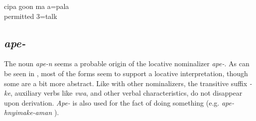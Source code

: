 \ea\label{ex:goon_hunpala}
\gll cipa goon ma a=pala\\
  permitted  3=talk\\
\glt {}
\z

\subsection{\textit{ape-}}
\label{ssec:ape}
The noun \textit{ape-n}  seems a probable origin of the locative nominalizer \textit{ape-}.
As can be seen in , most of the forms seem to support a locative interpretation, though some are a bit more abstract. Like with other nominalizers, the transitive suffix \textit{-ke}, auxiliary verbs like \textit{vwa}, and other verbal characteristics, do not disappear upon derivation. \textit{Ape-} is also used for the fact of doing something (e.g. \textit{ape-hnyimake-aman} ). 


